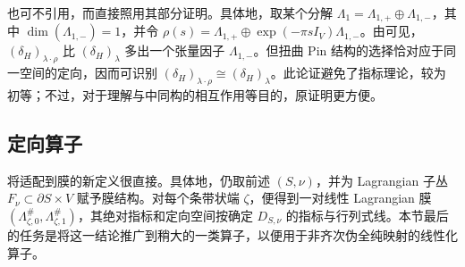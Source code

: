 \begin{note}\label{st:11.22}
也可不引用，而直接照用其部分证明。具体地，取某个分解 $\Lambda_1=\Lambda_{1,\allowbreak +}\oplus\Lambda_{1,\allowbreak -}$，其中 $\dim(\Lambda_{1,\allowbreak -})=1$，并令 $\rho(s)=\Lambda_{1,\allowbreak +}\oplus\exp(-\pi sI_V)\Lambda_{1,\allowbreak -}$。由可见，$(\delta_H)_{\lambda\cdot\rho}$ 比 $(\delta_H)_\lambda$ 多出一个张量因子 $\Lambda_{1,\allowbreak -}$。但扭曲 Pin 结构的选择恰对应于同一空间的定向，因而可识别 $(\delta_H)_{\lambda\cdot\rho}\cong(\delta_H)_\lambda$。此论证避免了指标理论，较为初等；不过，对于理解与中同构的相互作用等目的，原证明更方便。
\end{note}

\subsection{定向算子}\label{sec:11l}
将适配到膜的新定义很直接。具体地，仍取前述 $(S,\allowbreak \nu)$，并为 Lagrangian 子丛 $F_\nu\subset\partial S\times V$ 赋予膜结构。对每个条带状端 $\zeta$，便得到一对线性 Lagrangian 膜 $(\Lambda_{\zeta,\allowbreak 0}^\#,\allowbreak \Lambda_{\zeta,\allowbreak 1}^\#)$，其绝对指标和定向空间按确定 $D_{S,\allowbreak \nu}$ 的指标与行列式线。本节最后的任务是将这一结论推广到稍大的一类算子，以便用于非齐次伪全纯映射的线性化算子。


